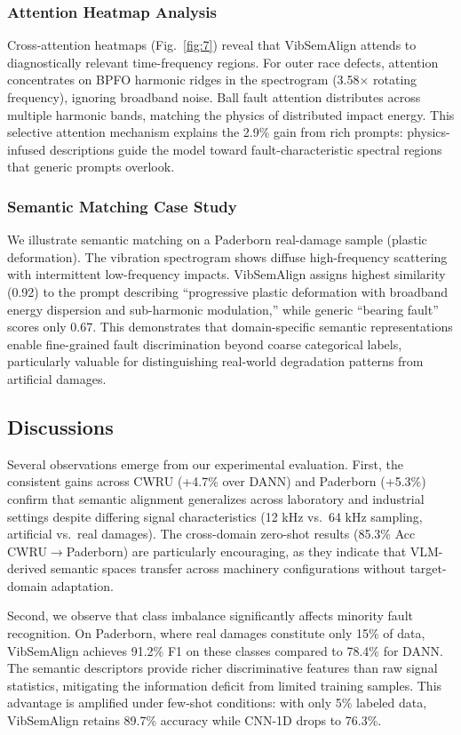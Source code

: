 \subsubsection{Attention Heatmap Analysis}
Cross-attention heatmaps (Fig.~\ref{fig:7}) reveal that VibSemAlign attends to diagnostically relevant time-frequency regions. For outer race defects, attention concentrates on BPFO harmonic ridges in the spectrogram (3.58$\times$ rotating frequency), ignoring broadband noise. Ball fault attention distributes across multiple harmonic bands, matching the physics of distributed impact energy. This selective attention mechanism explains the 2.9\% gain from rich prompts: physics-infused descriptions guide the model toward fault-characteristic spectral regions that generic prompts overlook.

\subsubsection{Semantic Matching Case Study}
We illustrate semantic matching on a Paderborn real-damage sample (plastic deformation). The vibration spectrogram shows diffuse high-frequency scattering with intermittent low-frequency impacts. VibSemAlign assigns highest similarity (0.92) to the prompt describing ``progressive plastic deformation with broadband energy dispersion and sub-harmonic modulation,'' while generic ``bearing fault'' scores only 0.67. This demonstrates that domain-specific semantic representations enable fine-grained fault discrimination beyond coarse categorical labels, particularly valuable for distinguishing real-world degradation patterns from artificial damages.

\subsection{Discussions}

Several observations emerge from our experimental evaluation. First, the consistent gains across CWRU (+4.7\% over DANN) and Paderborn (+5.3\%) confirm that semantic alignment generalizes across laboratory and industrial settings despite differing signal characteristics (12 kHz vs.\ 64 kHz sampling, artificial vs.\ real damages). The cross-domain zero-shot results (85.3\% Acc CWRU$\to$Paderborn) are particularly encouraging, as they indicate that VLM-derived semantic spaces transfer across machinery configurations without target-domain adaptation.

Second, we observe that class imbalance significantly affects minority fault recognition. On Paderborn, where real damages constitute only 15\% of data, VibSemAlign achieves 91.2\% F1 on these classes compared to 78.4\% for DANN. The semantic descriptors provide richer discriminative features than raw signal statistics, mitigating the information deficit from limited training samples. This advantage is amplified under few-shot conditions: with only 5\% labeled data, VibSemAlign retains 89.7\% accuracy while CNN-1D drops to 76.3\%.

